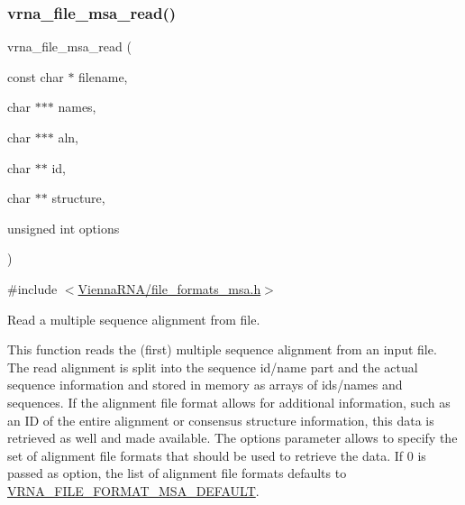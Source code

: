 \subsubsection{\texorpdfstring{vrna\+\_\+file\+\_\+msa\+\_\+read()}{vrna\_file\_msa\_read()}}
{\footnotesize\ttfamily vrna\+\_\+file\+\_\+msa\+\_\+read (\begin{DoxyParamCaption}\item[{const char $\ast$}]{filename,  }\item[{char $\ast$$\ast$$\ast$}]{names,  }\item[{char $\ast$$\ast$$\ast$}]{aln,  }\item[{char $\ast$$\ast$}]{id,  }\item[{char $\ast$$\ast$}]{structure,  }\item[{unsigned int}]{options }\end{DoxyParamCaption})}



{\ttfamily \#include $<$\hyperlink{file__formats__msa_8h}{Vienna\+R\+N\+A/file\+\_\+formats\+\_\+msa.\+h}$>$}



Read a multiple sequence alignment from file. 

This function reads the (first) multiple sequence alignment from an input file. The read alignment is split into the sequence id/name part and the actual sequence information and stored in memory as arrays of ids/names and sequences. If the alignment file format allows for additional information, such as an ID of the entire alignment or consensus structure information, this data is retrieved as well and made available. The {\ttfamily options} parameter allows to specify the set of alignment file formats that should be used to retrieve the data. If 0 is passed as option, the list of alignment file formats defaults to \hyperlink{group__file__utils_ga4acc255373831856a8417b68de8a94c0}{V\+R\+N\+A\+\_\+\+F\+I\+L\+E\+\_\+\+F\+O\+R\+M\+A\+T\+\_\+\+M\+S\+A\+\_\+\+D\+E\+F\+A\+U\+LT}.

